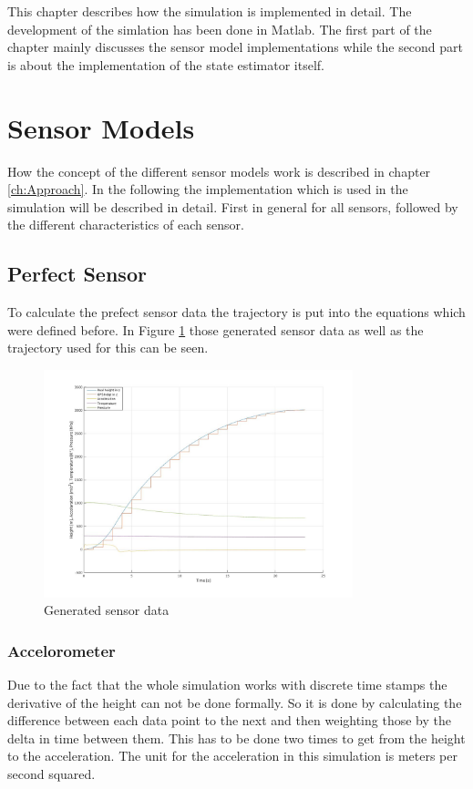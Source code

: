 This chapter describes how the simulation is implemented in detail.
The development of the simlation has been done in Matlab.
The first part of the chapter mainly discusses the sensor model implementations while the second part is about the implementation of the state estimator itself.

\section{Sensor Models}
How the concept of the different sensor models work is described in chapter \ref{ch:Approach}.
In the following the implementation which is used in the simulation will be described in detail.
First in general for all sensors, followed by the different characteristics of each sensor.

\subsection{Perfect Sensor}
To calculate the prefect sensor data the trajectory is put into the equations which were defined before.
In Figure \ref{fig:GeneratedPerfectSensor} those generated sensor data as well as the trajectory used for this can be seen.

\begin{figure}[h!]
 \centering
 \includegraphics[width=0.8\textwidth]{./Pictures/GeneratedSensorData.jpg}
 \caption{Generated sensor data}
 \label{fig:GeneratedPerfectSensor}
\end{figure}

\subsubsection{Accelorometer}
Due to the fact that the whole simulation works with discrete time stamps the derivative of the height can not be done formally.
So it is done by calculating the difference between each data point to the next and then weighting those by the delta in time between them.
This has to be done two times to get from the height to the acceleration.
The unit for the acceleration in this simulation is meters per second squared.

